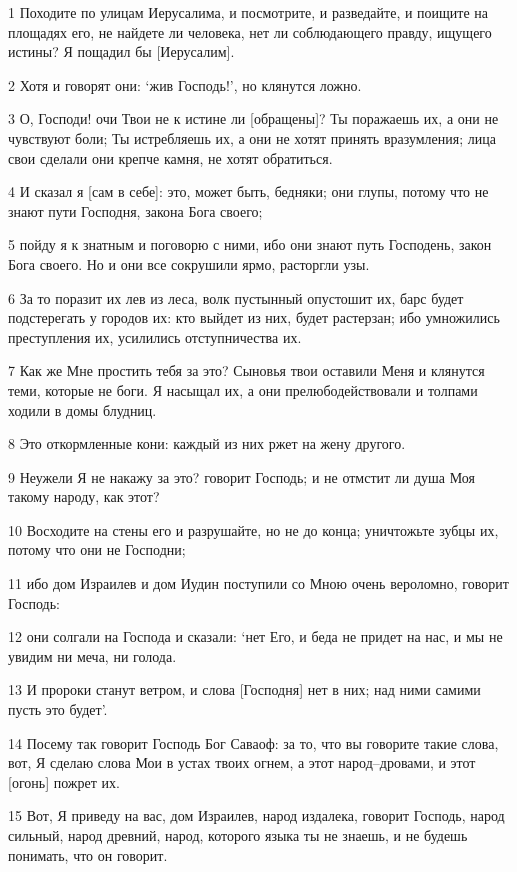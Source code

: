 \par 1 Походите по улицам Иерусалима, и посмотрите, и разведайте, и поищите на площадях его, не найдете ли человека, нет ли соблюдающего правду, ищущего истины? Я пощадил бы [Иерусалим].
\par 2 Хотя и говорят они: `жив Господь!', но клянутся ложно.
\par 3 О, Господи! очи Твои не к истине ли [обращены]? Ты поражаешь их, а они не чувствуют боли; Ты истребляешь их, а они не хотят принять вразумления; лица свои сделали они крепче камня, не хотят обратиться.
\par 4 И сказал я [сам в себе]: это, может быть, бедняки; они глупы, потому что не знают пути Господня, закона Бога своего;
\par 5 пойду я к знатным и поговорю с ними, ибо они знают путь Господень, закон Бога своего. Но и они все сокрушили ярмо, расторгли узы.
\par 6 За то поразит их лев из леса, волк пустынный опустошит их, барс будет подстерегать у городов их: кто выйдет из них, будет растерзан; ибо умножились преступления их, усилились отступничества их.
\par 7 Как же Мне простить тебя за это? Сыновья твои оставили Меня и клянутся теми, которые не боги. Я насыщал их, а они прелюбодействовали и толпами ходили в домы блудниц.
\par 8 Это откормленные кони: каждый из них ржет на жену другого.
\par 9 Неужели Я не накажу за это? говорит Господь; и не отмстит ли душа Моя такому народу, как этот?
\par 10 Восходите на стены его и разрушайте, но не до конца; уничтожьте зубцы их, потому что они не Господни;
\par 11 ибо дом Израилев и дом Иудин поступили со Мною очень вероломно, говорит Господь:
\par 12 они солгали на Господа и сказали: `нет Его, и беда не придет на нас, и мы не увидим ни меча, ни голода.
\par 13 И пророки станут ветром, и слова [Господня] нет в них; над ними самими пусть это будет'.
\par 14 Посему так говорит Господь Бог Саваоф: за то, что вы говорите такие слова, вот, Я сделаю слова Мои в устах твоих огнем, а этот народ--дровами, и этот [огонь] пожрет их.
\par 15 Вот, Я приведу на вас, дом Израилев, народ издалека, говорит Господь, народ сильный, народ древний, народ, которого языка ты не знаешь, и не будешь понимать, что он говорит.
